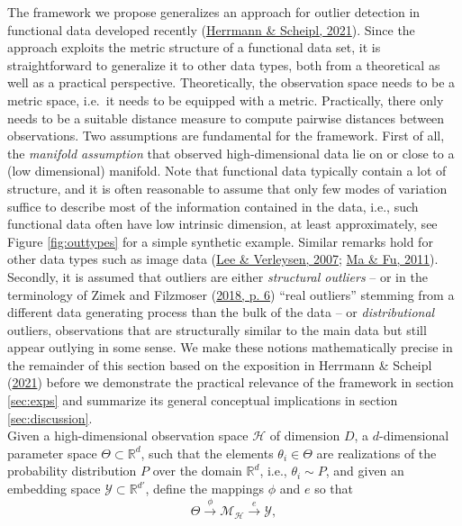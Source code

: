 \documentclass[
  10pt]{article}
\newcommand{\hdspace}{\mathcal{H}}
\newcommand{\embedspace}{\mathcal{Y}}
\newcommand{\pspace}{\Theta}
\newcommand{\mani}{\mathcal{M}}
\newcommand{\obsdim}{\ensuremath{D}}    %
\begin{document}
The framework we propose generalizes an approach for outlier detection in functional data developed recently (\protect\hyperlink{ref-herrmann2021geometric}{Herrmann \& Scheipl, 2021}).
Since the approach exploits the metric structure of a functional data set,
it is straightforward to generalize it to other data types, both from a theoretical as well as a practical perspective. Theoretically, the observation space needs to be a metric space, i.e.~it needs to be equipped with a metric. Practically, there only needs to be a suitable distance measure to compute pairwise distances between observations.
Two assumptions are fundamental for the framework. First of all, the \emph{manifold assumption} that observed high-dimensional data lie on or close to a (low dimensional) manifold.
Note that functional data typically contain a lot of structure, and it is often reasonable to assume that only few modes of variation suffice to describe most of the information contained in the data, i.e., such functional data often have low intrinsic dimension, at least approximately, see Figure \ref{fig:outtypes} for a simple synthetic example. Similar remarks hold for other data types such as image data (\protect\hyperlink{ref-lee2007nonlinear}{Lee \& Verleysen, 2007}; \protect\hyperlink{ref-ma2011manifold}{Ma \& Fu, 2011}). Secondly, it is assumed that outliers are either \emph{structural outliers} -- or in the terminology of Zimek and Filzmoser (\protect\hyperlink{ref-zimek2018there}{2018, p. 6}) ``real outliers'' stemming from a different data generating process than the bulk of the data -- or \emph{distributional} outliers, observations that are structurally similar to the main data but still appear outlying in some sense. We make these notions mathematically precise in the remainder of this section based on the exposition in Herrmann \& Scheipl (\protect\hyperlink{ref-herrmann2021geometric}{2021}) before we demonstrate the practical relevance of the framework in section \ref{sec:exps} and summarize its general conceptual implications in section \ref{sec:discussion}.\\
Given a high-dimensional observation space \(\hdspace\) of dimension \(\obsdim\), a \(d\)-dimensional parameter space \(\pspace \subset \mathbb{R}^d\), such that the elements \(\theta_i \in \pspace\) are realizations of the probability distribution \(P\) over the domain \(\mathbb{R}^d\), i.e., \(\theta_i \sim P\), and given an embedding space \(\embedspace \subset \mathbb{R}^{d'}\), define the mappings \(\phi\) and \(e\) so that
\[\Theta \stackrel{\phi}{\to} \mathcal{\mani_{\hdspace}} \stackrel{e}{\to} \mathcal{Y},\]
\end{document}
